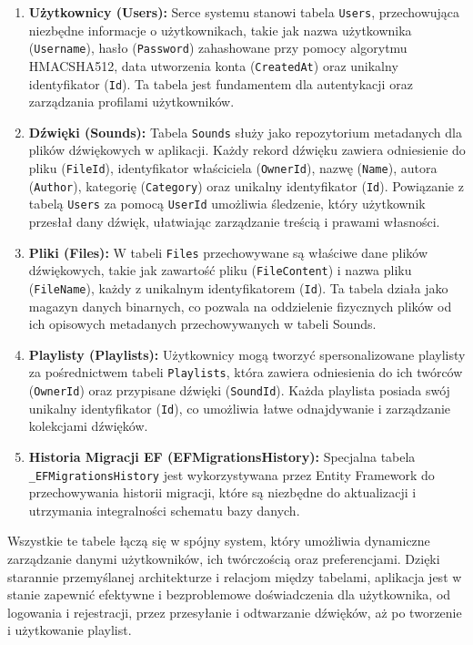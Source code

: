 \begin{enumerate}
    \item \textbf{Użytkownicy (Users):} Serce systemu stanowi tabela \texttt{Users}, przechowująca niezbędne informacje o użytkownikach, takie jak nazwa użytkownika (\texttt{Username}), hasło (\texttt{Password}) zahashowane przy pomocy algorytmu HMACSHA512, data utworzenia konta (\texttt{CreatedAt}) oraz unikalny identyfikator (\texttt{Id}). Ta tabela jest fundamentem dla autentykacji oraz zarządzania profilami użytkowników.
    \item \textbf{Dźwięki (Sounds):} Tabela \texttt{Sounds} służy jako repozytorium metadanych dla plików dźwiękowych w aplikacji. Każdy rekord dźwięku zawiera odniesienie do pliku (\texttt{FileId}), identyfikator właściciela (\texttt{OwnerId}), nazwę (\texttt{Name}), autora (\texttt{Author}), kategorię (\texttt{Category}) oraz unikalny identyfikator (\texttt{Id}). Powiązanie z tabelą \texttt{Users} za pomocą \texttt{UserId} umożliwia śledzenie, który użytkownik przesłał dany dźwięk, ułatwiając zarządzanie treścią i prawami własności.
    \item \textbf{Pliki (Files):} W tabeli \texttt{Files} przechowywane są właściwe dane plików dźwiękowych, takie jak zawartość pliku (\texttt{FileContent}) i nazwa pliku (\texttt{FileName}), każdy z unikalnym identyfikatorem (\texttt{Id}). Ta tabela działa jako magazyn danych binarnych, co pozwala na oddzielenie fizycznych plików od ich opisowych metadanych przechowywanych w tabeli Sounds.
    \item \textbf{Playlisty (Playlists):} Użytkownicy mogą tworzyć spersonalizowane playlisty za pośrednictwem tabeli \texttt{Playlists}, która zawiera odniesienia do ich twórców (\texttt{OwnerId}) oraz przypisane dźwięki (\texttt{SoundId}). Każda playlista posiada swój unikalny identyfikator (\texttt{Id}), co umożliwia łatwe odnajdywanie i zarządzanie kolekcjami dźwięków.
    \item \textbf{Historia Migracji EF (EFMigrationsHistory):} Specjalna tabela \texttt{\_EFMigrationsHistory} jest wykorzystywana przez Entity Framework do przechowywania historii migracji, które są niezbędne do aktualizacji i utrzymania integralności schematu bazy danych.

\end{enumerate}

Wszystkie te tabele łączą się w spójny system, który umożliwia dynamiczne zarządzanie danymi użytkowników, ich twórczością oraz preferencjami. Dzięki starannie przemyślanej architekturze i relacjom między tabelami, aplikacja jest w stanie zapewnić efektywne i bezproblemowe doświadczenia dla użytkownika, od logowania i rejestracji, przez przesyłanie i odtwarzanie dźwięków, aż po tworzenie i użytkowanie playlist.

